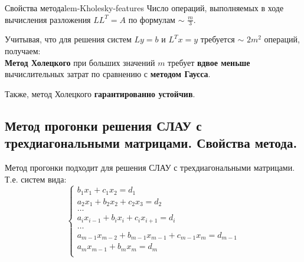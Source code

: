 \documentclass[14pt]{extarticle}
\begin{document}
        \begin{lemma}{Свойства метода}{lem-Kholesky-features}
            Число операций, выполняемых в ходе вычисления разложения $LL^{T} = A$ по формулам $\sim$ $\frac{m}{3}$.

            \vspace{\baselineskip}

            Учитывая, что для решения систем $Ly = b$ и $L^{T}x = y$ требуется $\sim$ $2m^{2}$ операций, получаем:\\
            \textbf{Метод Холецкого} при больших значений $m$ требует \textbf{вдвое меньше} вычислительных затрат по сравнению с \textbf{методом Гаусса}.

            \vspace{\baselineskip}

            Также, метод Холецкого \textbf{гарантированно устойчив}.
        \end{lemma}

\clearpage
\subsection{Метод прогонки решения СЛАУ с трехдиагональными матрицами. Свойства метода.}

        Метод прогонки подходит для решения СЛАУ с трехдиагональными матрицами.\\
        Т.е. систем вида:
        $$
        \begin{cases}
            b_{1}x_{1} + c_{1}x_{2} = d_{1}\\
            a_{2}x_{1} + b_{2}x_{2} + c_{2}x_{3} = d_{2}\\
            
            \ldots\\

            a_{i}x_{i-1} + b_{i}x_{i} + c_{i}x_{i+1} = d_{i}\\

            \ldots\\
            a_{m-1}x_{m-2} + b_{m-1}x_{m-1} + c_{m-1}x_{m} = d_{m-1}\\
            a_{m}x_{m-1} + b_{m}x_{m} = d_{m}\\
        \end{cases}
        $$
\end{document}

